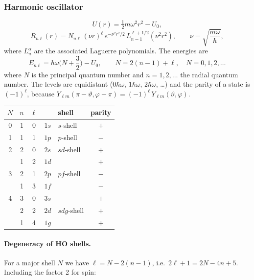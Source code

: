 \documentclass[11pt,a4paper]{article}
\begin{document}
\subsubsection*{Harmonic oscillator}
\[
U(r)=\tfrac12 m\omega^2r^2-U_0 ,
\]
\[
R_{n\ell}(r)=N_{n\ell}\,(\nu r)^\ell\,e^{-\nu^2r^2/2}\,L_{n-1}^{\ell+1/2}(\nu^2r^2),
\qquad \nu=\sqrt{\frac{m\omega}{\hbar}},
\]
where $L_{n}^{\alpha}$ are the associated Laguerre polynomials. The energies are
\[
E_{n\ell}=\hbar\omega\Big(N+\frac32\Big)-U_0,
\qquad N=2(n-1)+\ell,\quad N=0,1,2,\dots
\]
where $N$ is the principal quantum number and $n=1,2,\dots$ the radial quantum number. The levels are equidistant ($0\hbar\omega$, $1\hbar\omega$, $2\hbar\omega$, \dots) and the parity of a state is $(-1)^\ell$, because
$Y_{\ell m}(\pi-\vartheta,\varphi+\pi)=(-1)^\ell\,Y_{\ell m}(\vartheta,\varphi)$.
\begin{center}
\begin{tabular}{c c c c l c}
$N$ & $n$ & $\ell$ & & shell & parity \\ \hline
0 & 1 & 0 & $1s$ & $s$-shell & $+$ \\ \hline
1 & 1 & 1 & $1p$ & $p$-shell & $-$ \\ \hline
2 & 2 & 0 & $2s$ & $sd$-shell & $+$ \\
  & 1 & 2 & $1d$ &  & $+$ \\ \hline
3 & 2 & 1 & $2p$ & $pf$-shell & $-$ \\
  & 1 & 3 & $1f$ &  & $-$ \\ \hline
4 & 3 & 0 & $3s$ & & $+$ \\
  & 2 & 2 & $2d$ & $sdg$-shell & $+$ \\
  & 1 & 4 & $1g$ & & $+$ \\ \hline
\end{tabular}
\end{center}

\paragraph{Degeneracy of HO shells.} For a major shell $N$ we have $\ell=N-2(n-1)$, i.e.\ $2\ell+1=2N-4n+5$. Including the factor 2 for spin:
\end{document}

